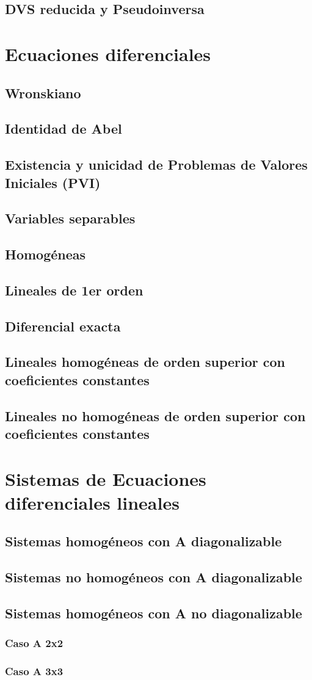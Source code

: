 \documentclass[oneside]{article}
\numberwithin{equation}{section}
\numberwithin{figure}{section}
\numberwithin{table}{section}
\begin{document}
				\subsection{DVS reducida y Pseudoinversa}
			\section{Ecuaciones diferenciales}
				\subsection{Wronskiano}
				\subsection{Identidad de Abel}
				\subsection{Existencia y unicidad de Problemas de Valores Iniciales (PVI)}
				\subsection{Variables separables}
				\subsection{Homogéneas}
				\subsection{Lineales de 1er orden}
				\subsection{Diferencial exacta}
				\subsection{Lineales homogéneas de orden superior con coeficientes constantes}
				\subsection{Lineales no homogéneas de orden superior con coeficientes constantes}
			\section{Sistemas de Ecuaciones diferenciales lineales}
				\subsection{Sistemas homogéneos con A diagonalizable}
				\subsection{Sistemas no homogéneos con A diagonalizable}
				\subsection{Sistemas homogéneos con A no diagonalizable}
					\subsubsection{Caso A 2x2}
					\subsubsection{Caso A 3x3}
				
\pagebreak
\end{document}
